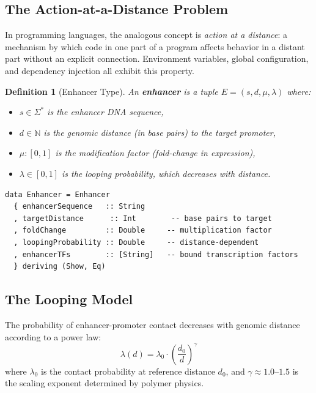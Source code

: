 \documentclass[12pt,a4paper]{article}
\newtheorem{definition}[theorem]{Definition}
\begin{document}
\subsection{The Action-at-a-Distance Problem}

In programming languages, the analogous concept is \emph{action at a distance}: a mechanism by which code in one part of a program affects behavior in a distant part without an explicit connection.  Environment variables, global configuration, and dependency injection all exhibit this property.

\begin{definition}[Enhancer Type]\label{def:enhancer}
An \textbf{enhancer} is a tuple $E = (s, d, \mu, \lambda)$ where:
\begin{itemize}
  \item $s \in \Sigma^*$ is the enhancer DNA sequence,
  \item $d \in \mathbb{N}$ is the genomic distance (in base pairs) to the target promoter,
  \item $\mu : [0,1]$ is the \emph{modification factor} (fold-change in expression),
  \item $\lambda \in [0,1]$ is the \emph{looping probability}, which decreases with distance.
\end{itemize}
\end{definition}

\begin{lstlisting}[caption={Enhancer type definition}]
data Enhancer = Enhancer
  { enhancerSequence   :: String
  , targetDistance      :: Int        -- base pairs to target
  , foldChange         :: Double     -- multiplication factor
  , loopingProbability :: Double     -- distance-dependent
  , enhancerTFs        :: [String]   -- bound transcription factors
  } deriving (Show, Eq)
\end{lstlisting}

\subsection{The Looping Model}

The probability of enhancer-promoter contact decreases with genomic distance according to a power law:
\begin{equation}\label{eq:looping}
\lambda(d) = \lambda_0 \cdot \left(\frac{d_0}{d}\right)^\gamma
\end{equation}
where $\lambda_0$ is the contact probability at reference distance $d_0$, and $\gamma \approx 1.0$--$1.5$ is the scaling exponent determined by polymer physics.
\end{document}

